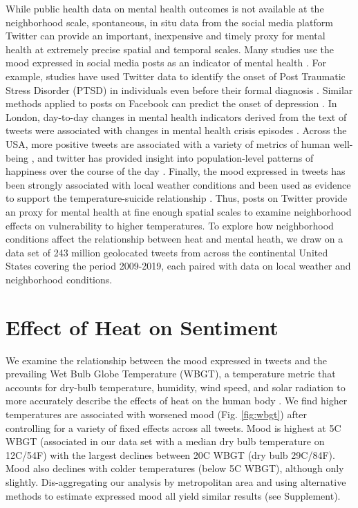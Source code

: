 \documentclass[fleqn,10pt]{wlscirep}
\begin{document}
While public health data on mental health outcomes is not available at the neighborhood scale, spontaneous, in situ data from the social media platform Twitter can provide an important, inexpensive and timely proxy for mental health at extremely precise spatial and temporal scales. Many studies use the mood expressed in social media posts as an indicator of mental health \cite{Edo-Osagie2020Jul, Sinnenberg2016Dec}. For example, studies have used Twitter data to identify the onset of Post Traumatic Stress Disorder (PTSD) in individuals even before their formal diagnosis \cite{Reece2017Oct}. Similar methods applied to posts on Facebook can predict the onset of depression \cite{Eichstaedt2018Oct}. In London, day-to-day changes in mental health indicators derived from the text of tweets were associated with changes in mental health crisis episodes \cite{Kolliakou2020Feb}. Across the USA, more positive tweets are associated with a variety of metrics of human well-being \cite{Mitchell2013May}, and twitter has provided insight into population-level patterns of happiness over the course of the day \cite{Dodds2011}. Finally, the mood expressed in tweets has been strongly associated with local weather conditions \cite{baylis_weather_2018} and been used as evidence to support the temperature-suicide relationship \cite{Burke2018Aug}. Thus, posts on Twitter provide an proxy for mental health at fine enough spatial scales to examine neighborhood effects on vulnerability to higher temperatures. To explore how neighborhood conditions affect the relationship between heat and mental heath, we draw on a data set of 243 million geolocated tweets from across the continental United States covering the period 2009-2019, each paired with data on local weather and neighborhood conditions.

\section*{Effect of Heat on Sentiment}
We examine the relationship between the mood expressed in tweets and the prevailing Wet Bulb Globe Temperature (WBGT), a temperature metric that accounts for dry-bulb temperature, humidity, wind speed, and solar radiation to more accurately describe the effects of heat on the human body \cite{budd2008wet}. We find higher temperatures are associated with worsened mood (Fig. \ref{fig:wbgt}) after controlling for a variety of fixed effects across all tweets. Mood is highest at 5\textdegree C WBGT (associated in our data set with a median dry bulb temperature on 12\textdegree C/54\textdegree F) with the largest declines between 20\textdegree C WBGT (dry bulb 29\textdegree C/84\textdegree F). Mood also declines with colder temperatures (below 5\textdegree C WBGT), although only slightly. Dis-aggregating our analysis by metropolitan area and using alternative methods to estimate expressed mood all yield similar results (see Supplement).
\end{document}
